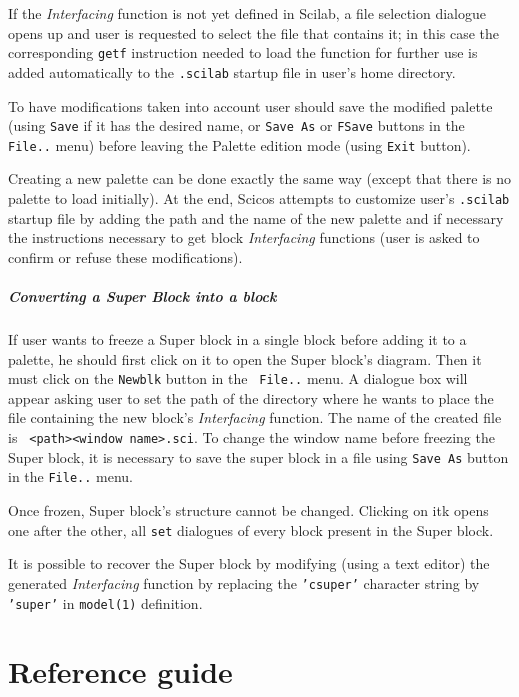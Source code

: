\documentclass{book}
\newcommand{\interfacing}{{\em Interfacing }}
\begin{document}
If the \interfacing function is not yet defined in Scilab,
a file selection dialogue opens up and user is requested to select
the file that contains it; in this case the corresponding 
{\tt getf} instruction needed to load the function for further use 
is added automatically to the {\tt .scilab} startup file in user's
home directory. 

To have modifications taken into account user should save the modified
palette (using {\tt Save} if it has the desired name, or
{\tt Save As} or {\tt FSave} buttons in the {\tt File..} menu) before
leaving the Palette edition mode (using {\tt Exit} button).

Creating a new palette can be done exactly the same way (except that
there is no palette to load initially). At the end, Scicos attempts to
customize user's {\tt .scilab} startup file by adding the path and
the name of the new palette and if necessary the instructions necessary
to get block \interfacing functions (user is asked to confirm or
refuse these modifications). 


\paragraph{Converting a Super Block into a block}
If user wants to freeze a Super block in a single block before adding
it to a palette, he should first click on it to open the Super block's
diagram. Then it must click on the {\tt Newblk} button in the {\tt
File..} menu. A dialogue box will appear asking user to set the path
of the directory where he wants to place the file containing the
new block's \interfacing function. The name of the created file is {\tt
<path><window name>.sci}. To change the window name before freezing
the Super block, it is necessary to save the super block in a file
using {\tt Save As} button in the {\tt File..} menu.

Once frozen, Super block's structure cannot be changed. 
Clicking on itk opens one after the other, all {\tt set} dialogues of
every block present in the Super block.

It is
possible to recover the Super block by modifying (using a text editor)
the generated \interfacing function  by replacing the {\tt 'csuper'}
character string by {\tt 'super'} in {\tt model(1)} definition.

\chapter{Reference guide}
\label{gui}

\end{document}
